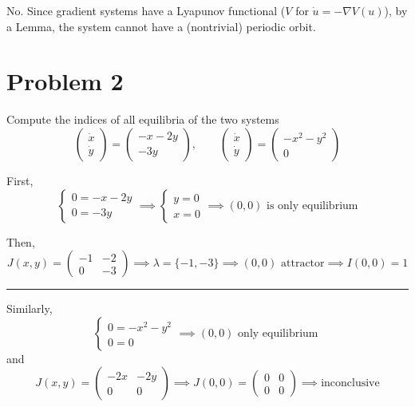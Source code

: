 \documentclass[12pt]{article}
\renewcommand{\div}{\vspace*{10pt}\hrule\vspace*{10pt}}
\begin{document}
\begin{enumerate}[(a)]
          \color{blue}
          No. Since gradient systems have a Lyapunov functional ($V$ for $\dot u = -\nabla V(u)$), by a Lemma, the system cannot have a (nontrivial) periodic orbit.
          \color{black}

\end{enumerate}

\pagebreak

\section{Problem 2}
Compute the indices of all equilibria of the two systems
\[\begin{pmatrix}
        \dot x \\
        \dot y
    \end{pmatrix} = \begin{pmatrix}
        -x - 2y \\
        -3y
    \end{pmatrix}, \qquad \begin{pmatrix}
        \dot x \\
        \dot y
    \end{pmatrix} = \begin{pmatrix}
        -x^2 - y^2 \\
        0
    \end{pmatrix}\]

\color{blue}
First,
\[\begin{cases}
        0 = -x - 2y \\
        0 = -3y
    \end{cases} \implies \begin{cases}
        y = 0 \\
        x = 0
    \end{cases} \implies (0, 0) \text{ is only equilibrium}\]

Then,
\[J(x, y) = \begin{pmatrix}
        -1 & -2 \\
        0  & -3
    \end{pmatrix} \implies \lambda = \{-1, -3\} \implies (0, 0) \text{ attractor} \implies \boxed{I(0, 0) = 1}\]

\div

\color{red}
Similarly,
\[\begin{cases}
        0 = -x^2 - y^2 \\
        0 = 0
    \end{cases} \implies (0, 0) \text{ only equilibrium }\]
and
\[J(x, y) = \begin{pmatrix}
        -2x & -2y \\
        0   & 0
    \end{pmatrix} \implies J(0, 0) = \begin{pmatrix}
        0 & 0 \\
        0 & 0
    \end{pmatrix} \implies \text{inconclusive}\]
\end{document}
